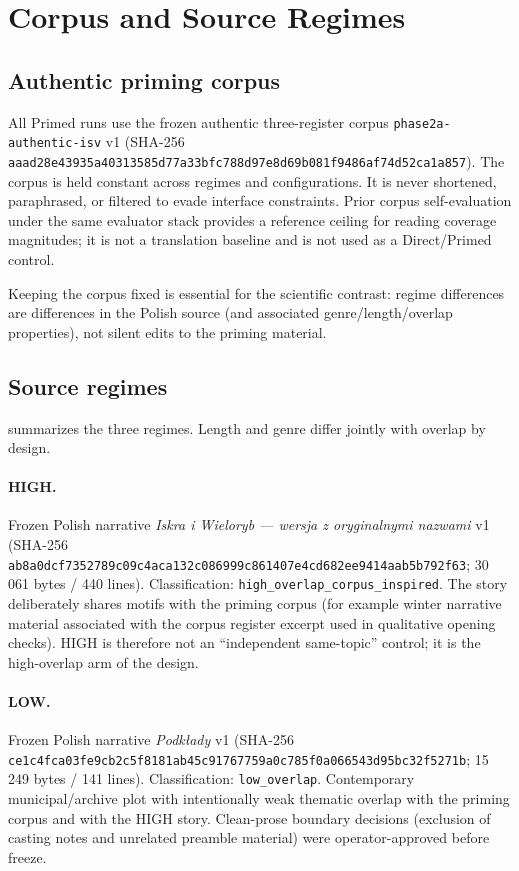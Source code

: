 \section{Corpus and Source Regimes}
\label{sec:corpus}

\subsection{Authentic priming corpus}
All Primed runs use the frozen authentic three-register corpus \texttt{phase2a-authentic-isv} v1
(SHA-256 \texttt{aaad28e43935a40313585d77a33bfc788d97e8d69b081f9486af74d52ca1a857}).
The corpus is held constant across regimes and configurations.
It is never shortened, paraphrased, or filtered to evade interface constraints.
Prior corpus self-evaluation under the same evaluator stack provides a reference ceiling for reading coverage magnitudes; it is not a translation baseline and is not used as a Direct/Primed control.

Keeping the corpus fixed is essential for the scientific contrast: regime differences are differences in the Polish source (and associated genre/length/overlap properties), not silent edits to the priming material.

\subsection{Source regimes}
 summarizes the three regimes.
Length and genre differ jointly with overlap by design.

\paragraph{HIGH.}
Frozen Polish narrative \emph{Iskra i Wieloryb --- wersja z oryginalnymi nazwami} v1
(SHA-256 \texttt{ab8a0dcf7352789c09c4aca132c086999c861407e4cd682ee9414aab5b792f63}; 30\,061 bytes / 440 lines).
Classification: \texttt{high\_overlap\_corpus\_inspired}.
The story deliberately shares motifs with the priming corpus (for example winter narrative material associated with the corpus register excerpt used in qualitative opening checks).
HIGH is therefore not an ``independent same-topic'' control; it is the high-overlap arm of the design.

\paragraph{LOW.}
Frozen Polish narrative \emph{Podk\l{}ady} v1
(SHA-256 \texttt{ce1c4fca03fe9cb2c5f8181ab45c91767759a0c785f0a066543d95bc32f5271b}; 15\,249 bytes / 141 lines).
Classification: \texttt{low\_overlap}.
Contemporary municipal/archive plot with intentionally weak thematic overlap with the priming corpus and with the HIGH story.
Clean-prose boundary decisions (exclusion of casting notes and unrelated preamble material) were operator-approved before freeze.

